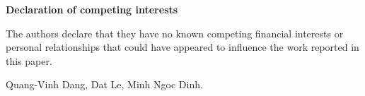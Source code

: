 \documentclass[11pt]{article}
\begin{document}
\begin{center}\large\textbf{Declaration of competing interests}\end{center}
\vspace{1em}

The authors declare that they have no known competing financial interests or
personal relationships that could have appeared to influence the work reported in
this paper.

\vspace{2em}
\noindent Quang-Vinh Dang, Dat Le, Minh Ngoc Dinh.
\end{document}
